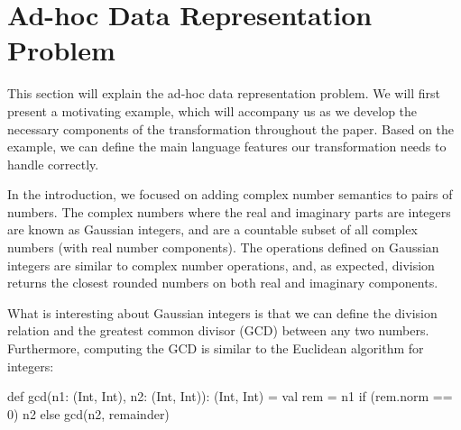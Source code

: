\section{Ad-hoc Data Representation Problem}
\label{sec:problem}

This section will explain the ad-hoc data representation problem. We will first present a motivating example, which will accompany us as we develop the necessary components of the transformation throughout the paper. Based on the example, we can define the main language features our transformation needs to handle correctly.

In the introduction, we focused on adding complex number semantics to pairs of numbers. The complex numbers where the real and imaginary parts are integers are known as Gaussian integers, and are a countable subset of all complex numbers (with real number components). The operations defined on Gaussian integers are similar to complex number operations, and, as expected, division returns the closest rounded numbers on both real and imaginary components.


What is interesting about Gaussian integers is that we can define the division relation and the greatest common divisor (GCD) between any two numbers. Furthermore, computing the GCD is similar to the Euclidean algorithm for integers:

\begin{lstlisting-nobreak}
def gcd(n1: (Int, Int), n2: (Int, Int)): (Int, Int) = {
  val rem = n1 %
  if (rem.norm == 0) n2 else gcd(n2, remainder)
}
\end{lstlisting-nobreak}

